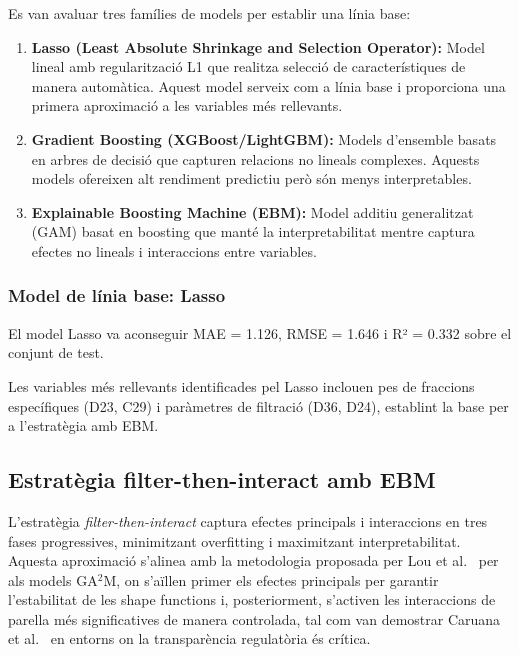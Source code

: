 Es van avaluar tres famílies de models per establir una línia base:

\begin{enumerate}
    \item \textbf{Lasso (Least Absolute Shrinkage and Selection Operator):} Model lineal amb regularització L1 que realitza selecció de característiques de manera automàtica. Aquest model serveix com a línia base i proporciona una primera aproximació a les variables més rellevants.

    \item \textbf{Gradient Boosting (XGBoost/LightGBM):} Models d'ensemble basats en arbres de decisió que capturen relacions no lineals complexes. Aquests models ofereixen alt rendiment predictiu però són menys interpretables.

    \item \textbf{Explainable Boosting Machine (EBM):} Model additiu generalitzat (GAM) basat en boosting que manté la interpretabilitat mentre captura efectes no lineals i interaccions entre variables.
\end{enumerate}

\subsubsection{Model de línia base: Lasso}
\label{subsubsec:model_baseline_lasso}

El model Lasso va aconseguir MAE = 1.126, RMSE = 1.646 i R² = 0.332 sobre el conjunt de test.

Les variables més rellevants identificades pel Lasso inclouen pes de fraccions específiques (D23, C29) i paràmetres de filtració (D36, D24), establint la base per a l'estratègia amb EBM.

\subsection{Estratègia filter-then-interact amb EBM}
\label{subsec:estrategia_filter_then_interact}

L'estratègia \emph{filter-then-interact} captura efectes principals i interaccions en tres fases progressives, minimitzant overfitting i maximitzant interpretabilitat. Aquesta aproximació s'alinea amb la metodologia proposada per Lou et al.~\cite{lou2013_ga2m} per als models GA$^2$M, on s'aïllen primer els efectes principals per garantir l'estabilitat de les shape functions i, posteriorment, s'activen les interaccions de parella més significatives de manera controlada, tal com van demostrar Caruana et al.~\cite{caruana2015_intelligible} en entorns on la transparència regulatòria és crítica.


